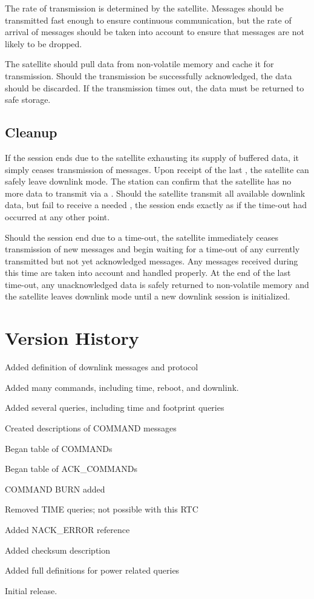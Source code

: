 \documentclass{article}
\begin{document}
  The rate of transmission is determined by the satellite. Messages should be
  transmitted fast enough to ensure continuous communication, but the rate of 
  arrival of \madownlink messages should be taken into account to ensure that
  messages are not likely to be dropped.
  
  The satellite should pull data from non-volatile memory and cache it for
  transmission. Should the transmission be successfully acknowledged, the
  data should be discarded. If the transmission times out, the data must be 
  returned to safe storage.  
  
  \subsection{Cleanup}
    If the session ends due to the satellite exhausting its supply of buffered
    data, it simply ceases transmission of \mdownlink messages. Upon receipt of 
    the last \madownlink, the satellite can safely leave downlink mode. The
    station can confirm that the satellite has no more data to transmit via a 
    \mquery. Should the satellite transmit all available downlink data, but
    fail to receive a needed \madownlink, the session ends exactly as if the
    time-out had occurred at any other point.
    
    Should the session end due to a time-out, the satellite immediately ceases
    transmission of new \mdownlink messages and begin waiting for a time-out of
    any currently transmitted but not yet acknowledged messages. Any \madownlink
    messages received during this time are taken into account and handled
    properly. At the end of the last time-out, any unacknowledged data is safely
    returned to non-volatile memory and the satellite leaves downlink mode until
    a new downlink session is initialized.

\section{Version History}

Added definition of downlink messages and protocol

Added many commands, including time, reboot, and downlink.

Added several queries, including time and footprint queries


Created descriptions of COMMAND messages

Began table of COMMANDs

Began table of ACK\_COMMANDs

COMMAND BURN added

Removed TIME queries; not possible with this RTC

Added NACK\_ERROR reference

Added checksum description

Added full definitions for power related queries


Initial release.

    
\end{document}
